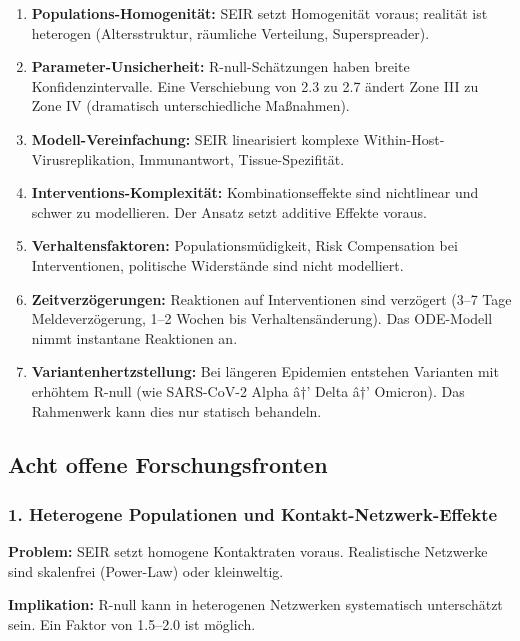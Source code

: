﻿\documentclass[a4paper,12pt,twoside]{article}
\theoremstyle{definition}
\begin{document}
\begin{enumerate}
\item \textbf{Populations-Homogenität:} SEIR setzt Homogenität voraus; realität ist heterogen (Altersstruktur, räumliche Verteilung, Superspreader).

\item \textbf{Parameter-Unsicherheit:} R-null-Schätzungen haben breite Konfidenzintervalle. Eine Verschiebung von 2.3 zu 2.7 ändert Zone III zu Zone IV (dramatisch unterschiedliche Maßnahmen).

\item \textbf{Modell-Vereinfachung:} SEIR linearisiert komplexe Within-Host-Virusreplikation, Immunantwort, Tissue-Spezifität.

\item \textbf{Interventions-Komplexität:} Kombinationseffekte sind nichtlinear und schwer zu modellieren. Der Ansatz setzt additive Effekte voraus.

\item \textbf{Verhaltensfaktoren:} Populationsmüdigkeit, Risk Compensation bei Interventionen, politische Widerstände sind nicht modelliert.

\item \textbf{Zeitverzögerungen:} Reaktionen auf Interventionen sind verzögert (3--7 Tage Meldeverzögerung, 1--2 Wochen bis Verhaltensänderung). Das ODE-Modell nimmt instantane Reaktionen an.

\item \textbf{Variantenhertzstellung:} Bei längeren Epidemien entstehen Varianten mit erhöhtem R-null (wie SARS-CoV-2 Alpha â†’ Delta â†’ Omicron). Das Rahmenwerk kann dies nur statisch behandeln.

\end{enumerate}

\subsection{Acht offene Forschungsfronten}

\subsubsection{1. Heterogene Populationen und Kontakt-Netzwerk-Effekte}

\textbf{Problem:} SEIR setzt homogene Kontaktraten voraus. Realistische Netzwerke sind skalenfrei (Power-Law) oder kleinweltig.

\textbf{Implikation:} R-null kann in heterogenen Netzwerken systematisch unterschätzt sein. Ein Faktor von 1.5--2.0 ist möglich.
\end{document}
